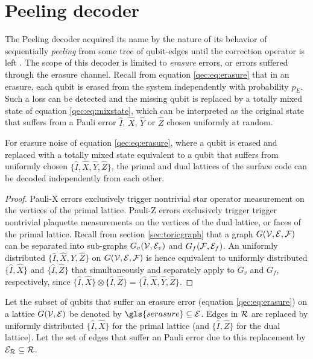 \section{Peeling decoder}\label{sec:peelingdecoder}
The Peeling decoder acquired its name by the nature of its behavior of sequentially \emph{peeling} from some tree of qubit-edges until the correction operator is left \cite{delfosse2017linear}. The scope of this decoder is limited to \emph{erasure} errors, or errors suffered through the erasure channel. Recall from equation \eqref{qec:eq:erasure} that in an erasure, each qubit is erased from the system independently with probability $p_E$. Such a loss can be detected and the missing qubit is replaced by a totally mixed state of equation \eqref{qec:eq:mixstate}, which can be interpreted as the original state that suffers from a Pauli error $\hat{I}$, $\hat{X}$, $\hat{Y}$ or $\hat{Z}$ chosen uniformly at random.
\begin{theorem}\label{the:independentxy}
  For erasure noise of equation \eqref{qec:eq:erasure}, where a qubit is erased and replaced with a totally mixed state equivalent to a qubit that suffers from uniformly chosen $\{\hat{I},\hat{X},\hat{Y},\hat{Z}\}$, the primal and dual lattices of the surface code can be decoded independently from each other.
\end{theorem}
\begin{proof}
  Pauli-X errors exclusively trigger nontrivial star operator measurement on the vertices of the primal lattice. Pauli-Z errors exclusively trigger trigger nontrivial plaquette measurements on the vertices of the dual lattice, or faces of the primal lattice. Recall from section \ref{sec:toricgraph} that a graph $G(\mathcal{V},\mathcal{E},\mathcal{F})$ can be separated into sub-graphs $G_v(\mathcal{V},\mathcal{E}_v)$ and $G_f(\mathcal{F},\mathcal{E}_f)$. An uniformly distributed $\{\hat{I},\hat{X},\hat{Y},\hat{Z}\}$ on $G(\mathcal{V},\mathcal{E},\mathcal{F})$ is hence equivalent to uniformly distributed $\{\hat{I}, \hat{X}\}$ and $\{\hat{I}, \hat{Z}\}$ that simultaneously and separately apply to $G_v$ and $G_f$, respectively, since $\{\hat{I}, \hat{X}\} \otimes \{\hat{I}, \hat{Z}\}=\{\hat{I},\hat{X},\hat{Y},\hat{Z}\}$.
\end{proof}
\begin{definition}\label{def:erasure}
  Let the subset of qubits that suffer an erasure error (equation \eqref{qec:eq:erasure}) on a lattice $G(\mathcal{V},\mathcal{E})$ be denoted by $\gls{serasure}\subseteq \m{E}$. Edges in $\mathcal{R}$ are replaced by uniformly distributed $\{\hat{I}, \hat{X}\}$ for the primal lattice (and $\{\hat{I}, \hat{Z}\}$ for the dual lattice). Let the set of edges that suffer an Pauli error due to this replacement by $\mathcal{E}_{\mathcal{R}}\subseteq \mathcal{R}$.
\end{definition}
